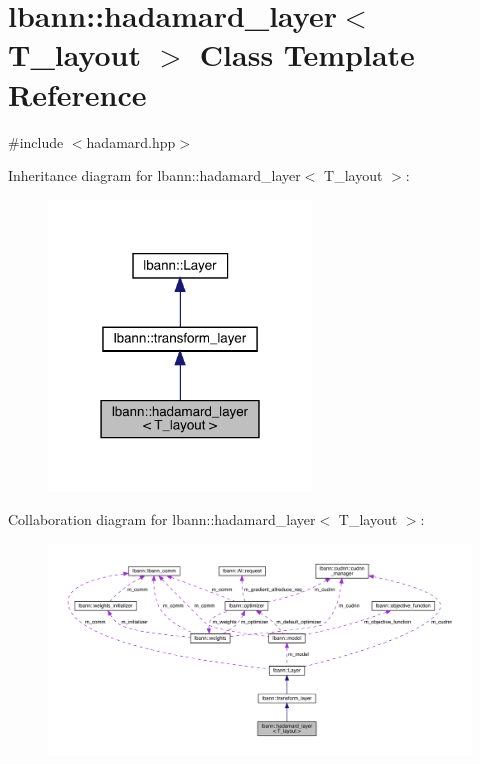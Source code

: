 \hypertarget{classlbann_1_1hadamard__layer}{}\section{lbann\+:\+:hadamard\+\_\+layer$<$ T\+\_\+layout $>$ Class Template Reference}
\label{classlbann_1_1hadamard__layer}


{\ttfamily \#include $<$hadamard.\+hpp$>$}



Inheritance diagram for lbann\+:\+:hadamard\+\_\+layer$<$ T\+\_\+layout $>$\+:\nopagebreak
\begin{figure}[H]
\begin{center}
\leavevmode
\includegraphics[width=198pt]{classlbann_1_1hadamard__layer__inherit__graph}
\end{center}
\end{figure}


Collaboration diagram for lbann\+:\+:hadamard\+\_\+layer$<$ T\+\_\+layout $>$\+:\nopagebreak
\begin{figure}[H]
\begin{center}
\leavevmode
\includegraphics[width=350pt]{classlbann_1_1hadamard__layer__coll__graph}
\end{center}
\end{figure}
